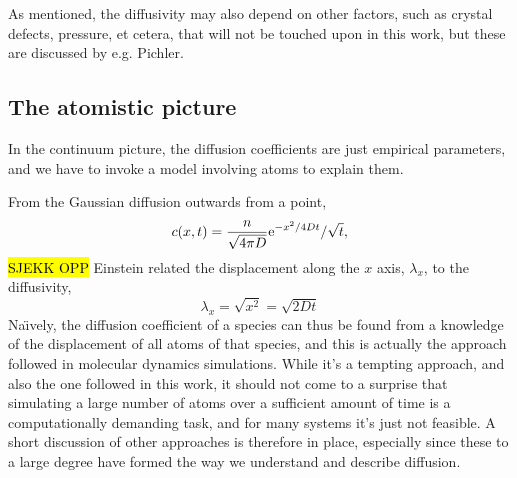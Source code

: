 \documentclass[11pt,bibliography=totoc,index=totoc]{scrbook}   %
\newcommand{\comment}[1]{\hl{#1}}
\begin{document}


As mentioned, the diffusivity may also depend on other factors, such as crystal defects, pressure, et cetera, that will not be touched upon in this work, but these are discussed by e.g. Pichler.\cite{Pichler:2004}

%
\subsection{The atomistic picture}\label{sec:AtomisticPicture}
%

In the continuum picture, the diffusion coefficients are just empirical parameters, and we have to invoke a model involving atoms to explain them.

From the Gaussian diffusion outwards from a point,
\begin{equation}
    c(x,t) = \frac{n}{\sqrt{4\pi D}} \mathrm{e}^{-x^2/4Dt} / \sqrt{t},
\end{equation}
\comment{SJEKK OPP}
Einstein related the displacement along the $x$ axis, $\lambda_x$, to the diffusivity\cite{Einstein:1905},
\begin{equation}
    \lambda_x = \sqrt{x^2} = \sqrt{2Dt}
  \label{eq:einsteinRelationSimple}
\end{equation}
Na\"{\i}vely, the diffusion coefficient of a species can thus be found from a knowledge of the displacement of all atoms of that species,
and this is actually the approach followed in molecular dynamics simulations.
While it's a tempting approach, and also the one followed in this work, it should not come to a surprise that simulating a large number of atoms over a sufficient amount of time is a computationally demanding task, and for many systems it's just not feasible. 
A short discussion of other approaches is therefore in place, especially since these to a large degree have formed the way we understand and describe diffusion.
\end{document}
